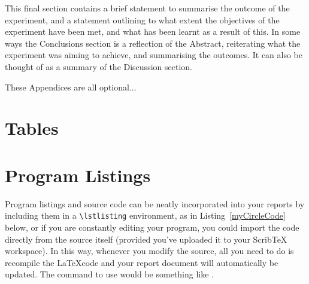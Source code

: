 \documentclass[11pt, a4paper]{article}
\begin{document}
This final section contains a brief statement to summarise the outcome of the experiment, and a statement outlining to what extent the objectives of the experiment have been met, and what has been learnt as a result of this. In some ways the Conclusions section is a reflection of the Abstract, reiterating what the experiment was aiming to achieve, and summarising the outcomes. It can also be thought of as a summary of the Discussion section. 

%


  



\newpage
\appendix
\appendixpage
\addappheadtotoc

These Appendices are all optional...

\section{Tables}


\section{Program Listings}

Program listings and source code can be neatly incorporated into your reports by including them in a \verb|\lstlisting| environment, as in Listing~\ref{myCircleCode} below, or if you are constantly editing your program, you could import the code directly from the source itself (provided you've uploaded it to your ScribTeX workspace). In this way, whenever you modify the source, all you need to do is recompile the \LaTeX code and your report document will automatically be updated. The command to use would be something like \verb||.
\end{document}
